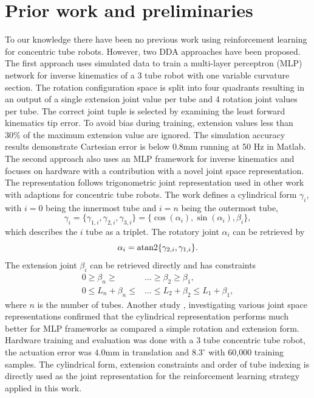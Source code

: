 \section{Prior work and preliminaries}
\label{prelims}
To our knowledge there have been no previous work using reinforcement learning for concentric tube robots. However, two DDA approaches have been proposed. The first approach \cite{Bergeles2015} uses simulated data to train a multi-layer perceptron (MLP) network for inverse kinematics of a 3 tube robot with one variable curvature section. The rotation configuration space is split into four quadrants resulting in an output of a single extension joint value per tube and 4 rotation joint values per tube. The correct joint tuple is selected by examining the least forward kinematics tip error. To avoid bias during training, extension values less than 30\% of the maximum extension value are ignored. The simulation accuracy results demonstrate Cartesian error is below 0.8mm running at 50 Hz in Matlab. The second approach \cite{Grassmann2018} also uses an MLP framework for inverse kinematics and focuses on hardware with a contribution with a novel joint space representation. The representation follows trigonometric joint representation used in other work with adaptions for concentric tube robots. The work defines a cylindrical form $\gamma_i$, with $i=0$ being the innermost tube and $i=n$ being the outermost tube,
\begin{equation}
\gamma_i = \{ \gamma_{1,i}, \gamma_{2,i}, \gamma_{3,i} \} = \{ \cos(\alpha_i), \sin(\alpha_i), \beta_i \},\label{eqn:cylindrical-representation}
\end{equation}
which describes the $i$ tube as a triplet. The rotatory joint $\alpha_i$ can be retrieved by
\begin{equation}
\alpha_i = \textnormal{atan2} \{ \gamma_{2,i}, \gamma_{1,i} \}. \label{eqn:alpha}
\end{equation}
The extension joint $\beta_i$ can be retrieved directly and has constraints
\begin{align}
0 \geq \beta_n \geq & \dots \geq \beta_2 \geq \beta_1, \label{eqn:beta-constraints} \\
0 \leq L_n + \beta_n \leq & \dots \leq L_2 + \beta_2 \leq L_1 + \beta_1, \label{eqn:extension-constraints}
\end{align}
where $n$ is the number of tubes. Another study \cite{Grassmann2019}, investigating various joint space representations confirmed that the cylindrical representation performs much better for MLP frameworks as compared a simple rotation and extension form. Hardware training and evaluation was done with a 3 tube concentric tube robot, the actuation error was $4.0$mm in translation and $8.3 ^{\circ}$ with 60,000 training samples. The cylindrical form, extension constraints and order of tube indexing is directly used as the joint representation for the reinforcement learning strategy applied in this work.

